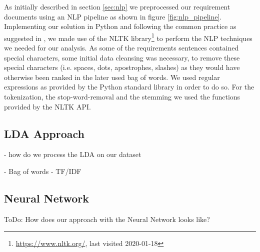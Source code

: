 As initially described in section \ref{sec:nlp} we preprocessed our requirement documents using an NLP pipeline as shown in figure \ref{fig:nlp_pipeline}. Implementing our solution in Python and following the common practice as suggested in \cite{ferrari_natural_2018}, we made use of the NLTK library\footnote{\url{https://www.nltk.org/}, last visited 2020-01-18} to perform the NLP techniques we needed for our analysis. As some of the requirements sentences contained special characters, some initial data cleansing was necessary, to remove these special characters (i.e. spaces, dots, apostrophes, slashes) as they would have otherwise been ranked in the later used bag of words. We used regular expressions as provided by the Python standard library in order to do so. For the tokenization, the stop-word-removal and the stemming we used the functions provided by the NLTK API.

\subsection{LDA Approach} %
\label{sub:own_lda}
- how do we process the LDA on our dataset

- Bag of words
- TF/IDF

\subsection{Neural Network} %
\label{sub:own_neuralnetwork}

\colorbox{yellow!30}{ToDo:} How does our approach with the Neural Network looks like?
